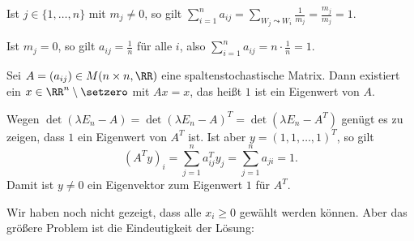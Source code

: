 \begin{beweis}
	Ist $j \in \{1,\dots,n\}$ mit $m_j \neq 0$, so gilt $\sum_{i=1}^{n} a_{ij} = \sum_{W_j \leadsto W_i} \frac{1}{m_j} = \frac{m_j}{m_j} = 1$.
	
	Ist $m_j = 0$, so gilt $a_{ij} = \frac{1}{n}$ für alle $i$, also $\sum_{i=1}^{n} a_{ij} = n \cdot \frac{1}{n} = 1$. \qedhere
\end{beweis}

\begin{lemma}
	\label{lemma:13.5}
	Sei $A = (a_{ij}) \in M(n \times n, \RR)$ eine spaltenstochastische Matrix.
	Dann existiert ein $x \in \RR^n \setminus \setzero$ mit $Ax = x$, das heißt $1$ ist ein Eigenwert von $A$.
\end{lemma}

\begin{beweis}
	Wegen $\det(\lambda E_n - A) = \det(\lambda E_n - A)^T = \det(\lambda E_n - A^T)$ genügt es zu zeigen, dass $1$ ein Eigenwert von $A^T$ ist.
	Ist aber $y = (1,1,\dots,1)^T$, so gilt 
	\[
		(A^Ty)_i = \sum_{j=1}^{n} a_{ij}^T y_j = \sum_{j=1}^{n} a_{ji} = 1.
	\]
	Damit ist $y \neq 0$ ein Eigenvektor zum Eigenwert $1$ für $A^T$. \qedhere
\end{beweis}

Wir haben noch nicht gezeigt, dass alle $x_i \geq 0$ gewählt werden können.
Aber das größere Problem ist die Eindeutigkeit der Lösung:

